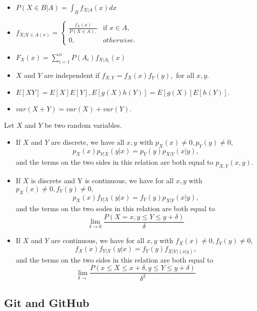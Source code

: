 \documentclass{article}
\begin{document}
\begin{itemize}
\item

$P(X\in B|A) = \int_Bf_{X|A}(x)dx$
\item

$f_{X|{X\in A}(x)} = \left\{ \begin{array}{ll}
\frac{f_X(x)}{P(X\in A),} & \mbox{if $x\in A,$}\\
0, & \mbox{$otherwise.$}\end{array} \right.$
\item

$F_X(x) = \sum\limits_{i=1}^nP(A_i)f_{X|A_i}(x)$
\end{itemize}
\begin{itemize}
\item

$X$ and $Y$ are independent if $f_{X,Y} = f_X(x)f_Y(y),$ for all $x,y$.
\item

$E[XY] = E[X]E[Y], E[g(X)h(Y)] = E[g(X)]E[h(Y)].$
\item

$var(X + Y) = var(X) + var(Y).$
\end{itemize}

Let $X$ and $Y$ be two random variables.
\begin{itemize}
\item

If $X$ and $Y$ are discrete, we have all $x,y$ with $p_X(x)\neq 0, p_Y(y)\neq 0$,\[p_X(x)p_{Y|X}(y|x) = p_Y(y)p_{X|Y}(x|y),\]and the terms on the two sides in this relation are both equal to $p_{X,Y}(x,y)$.
\item

If $X$ is discrete and Y is continuous, we have for all $x,y$ with $p_X(x)\neq 0, f_Y(y)\neq 0,$\[p_X(x)f_{Y|X}(y|x) = f_Y(y)p_{X|Y}(x|y),\]and the terms on the two sodes in this relation are both equal to\[\lim_{\delta\rightarrow 0}\frac{P(X = x, y\leq Y\leq y + \delta)}{\delta}\]
\item

If $X$ and $Y$ are continuous, we have for all $x,y$ with $f_X(x)\neq 0, f_Y(y)\neq 0$,\[f_X(x)f_{Y|X}(y|x) = f_Y(y)f_{X|Y)(x|y)},\]and the terms on the two sides in this relation are both equal to \[\lim_{\delta\rightarrow}\frac{P(x\leq X\leq x + \delta, y\leq Y\leq y + \delta)}{\delta^2}\]
\end{itemize}

\subsection{Git and GitHub}
\end{document}
